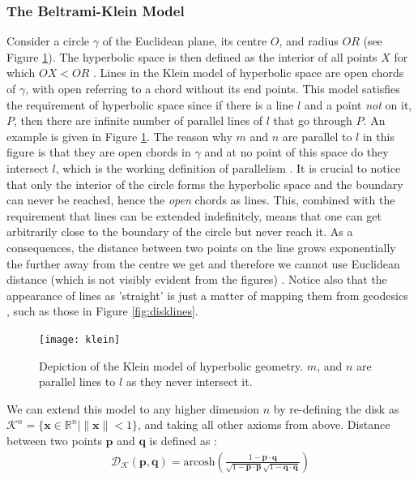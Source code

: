 \documentclass[12pt]{report}
\begin{document}
\subsubsection{The Beltrami-Klein Model}
Consider a circle $\gamma$ of the Euclidean plane, its centre $O$, and radius $OR$ (see Figure \ref{fig:klein}). The hyperbolic space is then defined as the interior of all points $X$ for which $OX < OR$ \cite{Greenberg1994}. Lines in the Klein model of hyperbolic space are open chords of $\gamma$, with open referring to a chord without its end points. This model satisfies the requirement of hyperbolic space since if there is a line $l$ and a point \textit{not} on it, $P$, then there are infinite number of parallel lines of $l$ that go through $P$. An example is given in Figure \ref{fig:klein}. The reason why $m$ and $n$ are parallel to $l$ in this figure is that they are open chords in $\gamma$ and at no point of this space do they intersect $l$, which is the working definition of parallelism \cite{Greenberg1994}. It is crucial to notice that only the interior of the circle forms the hyperbolic space and the boundary can never be reached, hence the \textit{open} chords as lines. This, combined with the requirement that lines can be extended indefinitely, means that one can get arbitrarily close to the boundary of the circle but never reach it. As a consequences, the distance between two points on the line grows exponentially the further away from the centre we get and therefore we cannot use Euclidean distance (which is not visibly evident from the figures) \cite{Greenberg1994}. Notice also that the appearance of lines as 'straight' is just a matter of mapping them from geodesics \cite{Greenberg1994}, such as those in Figure \ref{fig:disklines}. 

\begin{figure}
  \centering
	\texttt{[image: klein]}
	\caption{Depiction of the Klein model of hyperbolic geometry. $m$, and $n$ are parallel lines to $l$ as they never intersect it.}
	\label{fig:klein}
\end{figure}

We can extend this model to any higher dimension $n$ by re-defining the disk as $\mathcal{K}^n = \{\mathbf{x} \in \mathbb{R}^n | \lVert \mathbf{x} \rVert <1 \}$, and taking all other axioms from above. Distance between two points $\mathbf{p}$ and $\mathbf{q}$ is defined as \cite{Iversen1992}:
\begin{align}
  \mathcal{D_K}(\mathbf{p}, \mathbf{q}) = \text{arcosh} \left( \frac{1 - \mathbf{p} \cdot \mathbf{q}}{\sqrt{1-\mathbf{p}\cdot \mathbf{p}}\sqrt{1-\mathbf{q}\cdot \mathbf{q}}}   \right) 
  \label{eq:kdist}
\end{align}
\end{document}
